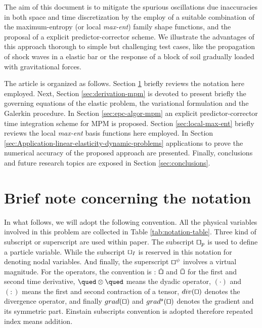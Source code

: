 The aim of this document is to mitigate the spurious oscillations due
inaccuracies in both space and time discretization by the employ of a
suitable combination of the maximum-entropy (or local
\textit{max-ent}) family shape functions, and the proposal of
a explicit predictor-corrector scheme. We illustrate the advantages of
this approach thorough to simple but challenging test cases, like the
propagation of shock waves in a elastic bar or the response of a block of soil
gradually loaded with gravitational forces.

The article is organized as follows. Section \ref{sec:Notation}
briefly reviews the notation here employed. Next, Section \ref{sec:derivation-mpm}
is devoted to present briefly the governing equations of the elastic
problem, the variational formulation and the Galerkin procedure. In Section \ref{sec:epc-algor-mpm} an explicit predictor-corrector
time integration scheme for MPM is proposed. Section
\ref{sec:local-max-ent} briefly reviews the local \textit{max-ent}
basis functions here employed. In Section
\ref{sec:Application-linear-elasticity-dynamic-problems} applications
to prove the numerical accuracy of the proposed approach are presented. Finally,
conclusions and future research topics are exposed in Section \ref{sec:conclusions}.

\section{Brief note concerning the notation}
\label{sec:Notation}
In what follows, we will adopt the following convention. All the
physical variables involved in this problem are collected in Table
\ref{tab:notation-table}. Three kind of subscript or superscript are used within paper. The
subscript $\qed_p$ is used to define a particle variable. While the
subscript $\qed_I$ is reserved in this notation for denoting nodal
variables. And finally, the superscript $\qed^{\psi}$ involves a
virtual magnitude. For the operators, the convention is : $\dot{\qed}$ and
$\ddot{\qed}$ for the first and second time derivative, $\qued \otimes
\qued$ means the dyadic operator, $(\cdot)$ and $(\colon)$ means the first
and second contraction of a tensor, $\Div{\qed}$ denotes the
divergence operator, and finally $\Grad{\qed}$ and $\GradS{\qed}$
denotes the gradient and its symmetric part. Einstain subscripts
convention is adopted therefore repeated index means addition. 

